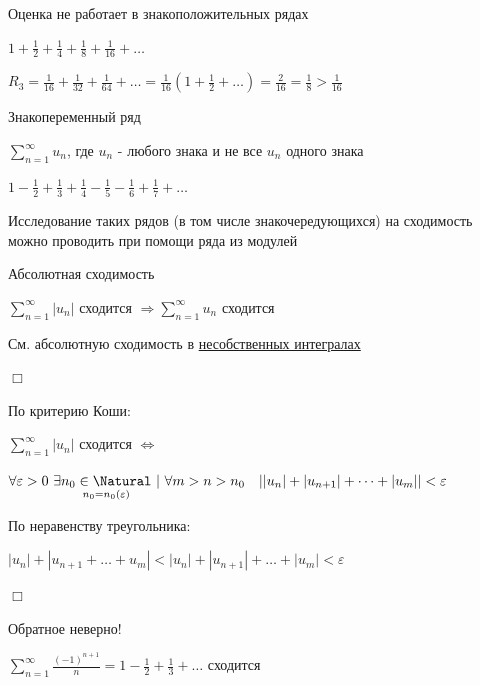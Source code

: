\documentclass[12pt]{article}
\begin{document}
    \Nota Оценка не работает в знакоположительных рядах

    $1 + \frac{1}{2} + \frac{1}{4} + \frac{1}{8} + \frac{1}{16} + \dots$

    $R_3 = \frac{1}{16} + \frac{1}{32} + \frac{1}{64} + \dots = \frac{1}{16} \left(1 + \frac{1}{2} + \dots\right) = \frac{2}{16} = \frac{1}{8} > \frac{1}{16}$

    \hypertarget{changingsignseries}{}

    \Def Знакопеременный ряд

    $\sum_{n = 1}^\infty u_n$, где $u_n$ - любого знака и не все $u_n$ одного знака

    \Ex $1 - \frac{1}{2} + \frac{1}{3} + \frac{1}{4} - \frac{1}{5} - \frac{1}{6} + \frac{1}{7} + \dots$

    \Nota Исследование таких рядов (в том числе знакочередующихся) на сходимость можно проводить при помощи ряда из модулей

    \hypertarget{absoluteconvergence}{}

    \begin{MyTheorem}
        \Ths Абсолютная сходимость

        $\sum_{n = 1}^\infty |u_n|$ сходится $\Longrightarrow \sum_{n = 1}^\infty u_n$ сходится
    \end{MyTheorem}

    \Mems См. абсолютную сходимость в \href{https://pelmesh619.github.io/itmo_conspects/conspects/calculus/calculus_superconspect.pdf}{несобственных интегралах}

    \begin{MyProof}
        $\Box$

        По критерию Коши:

        $\sum_{n = 1}^\infty |u_n|$ сходится $\Longleftrightarrow$

        $\forall \varepsilon > 0 \ \exists \underset{n_0 = n_0(\varepsilon)}{n_0 \in \Natural} \ | \ \forall m > n > n_0 \quad ||u_n| + |u_{n + 1}| + \dots + |u_m|| < \varepsilon$

        По неравенству треугольника:

        $|u_n| + |u_{n + 1} + \dots + u_m| < |u_n| + |u_{n + 1}| + \dots + |u_m| < \varepsilon$

        $\Box$
    \end{MyProof}

    \Notas Обратное неверно!

    \Ex $\sum_{n = 1}^\infty \frac{(-1)^{n + 1}}{n} = 1 - \frac{1}{2} + \frac{1}{3} + \dots $ сходится
\end{document}
